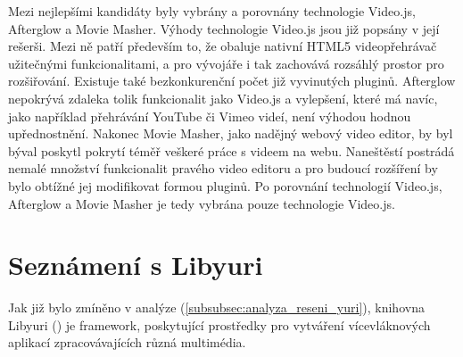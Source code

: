 \documentclass[thesis=M,czech]{FITthesis}[2012/06/26]
\begin{document}
Mezi nejlepšími kandidáty byly vybrány a porovnány technologie Video.js, Afterglow a Movie Masher. Výhody technologie Video.js jsou již popsány v její rešerši. Mezi ně patří především to, že obaluje nativní HTML5 videopřehrávač užitečnými funkcionalitami, a pro vývojáře i tak zachovává rozsáhlý prostor pro rozšiřování. Existuje také bezkonkurenční počet již vyvinutých pluginů. Afterglow nepokrývá zdaleka tolik funkcionalit jako Video.js a vylepšení, které má navíc, jako například přehrávání YouTube či Vimeo videí, není výhodou hodnou upřednostnění. Nakonec Movie Masher, jako nadějný webový video editor, by byl býval poskytl pokrytí téměř veškeré práce s videem na webu. Naneštěstí postrádá nemalé množství funkcionalit pravého video editoru a pro budoucí rozšíření by bylo obtížné jej modifikovat formou pluginů. Po porovnání technologií Video.js, Afterglow a Movie Masher je tedy vybrána pouze technologie Video.js.

\section{Seznámení s Libyuri} \label{sec:analyza_yuri}
Jak již bylo zmíněno v analýze (\ref{subsubsec:analyza_reseni_yuri}), knihovna Libyuri (\cite{yuri}) je framework, poskytující prostředky pro vytváření vícevláknových aplikací zpracovávajících různá multimédia.
\end{document}
